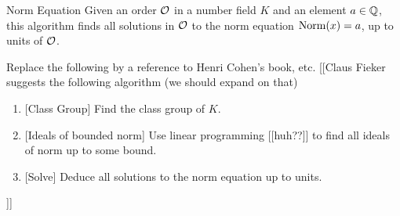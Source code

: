 \documentclass{article}
\begin{document}
\begin{algorithm}{Norm Equation}
Given an order $\mathcal{O}$ in a number field $K$ and an element $a\in \mathbb{Q}$,
this algorithm finds all solutions in $\mathcal{O}$ to the norm equation
$\operatorname{Norm}(x)=a$, up to units of $\mathcal{O}$.

Replace the following by a reference to Henri Cohen's book, etc.
[[Claus Fieker suggests the following algorithm (we should expand on that)
\begin{enumerate}
\item{} [Class Group] Find the class group of $K$.
\item{} [Ideals of bounded norm] Use linear programming [[huh??]] to find all ideals of
norm up to some bound.
\item{} [Solve] Deduce all solutions to the norm equation up to units.
\end{enumerate}
\end{algorithm}
]]
\end{document}
